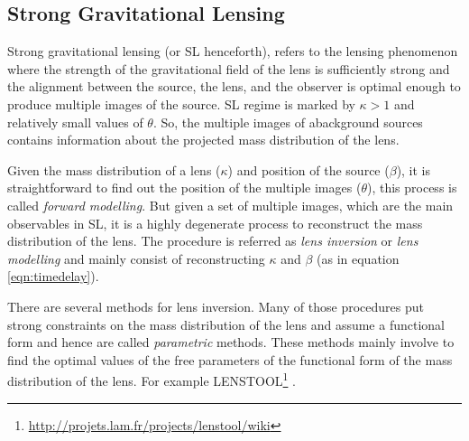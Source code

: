 \documentclass[
  11pt,
  twoside,
  openright,
  titlepage,
  headings=optiontoheadandtoc
]{scrbook}
\begin{document}

\subsection{Strong Gravitational Lensing}\label{sec:sl}

Strong gravitational lensing (or SL henceforth), refers to the lensing phenomenon
where the strength of the gravitational field of the lens is sufficiently strong and
the alignment between the source, the lens, and the observer is optimal enough to
produce multiple images of the source. SL regime is marked
by $\kappa >1$ and relatively small values of $\theta$. So, the multiple images of abackground sources contains information about the projected mass distribution of the lens. 

Given the mass distribution of a lens ($\kappa$) and position of the source ($\beta$),
it is straightforward to find out the position of the multiple images ($\theta$), this process
is called {\it forward modelling}. But given a set of multiple images, which are the main 
observables in SL, it is a highly degenerate process to reconstruct the mass
distribution of the lens. The procedure is referred as {\it lens inversion} or
{\it lens modelling} and mainly consist of reconstructing $\kappa$ and
$\beta$ (as in equation \ref{eqn:timedelay}). 

There are 
several methods for lens inversion. Many of those procedures put strong constraints
on the mass distribution of the lens and assume a functional form and hence are called
{\it parametric} methods. These methods mainly involve to find the optimal values 
of the free parameters of the functional form of the mass distribution of the lens. 
For example LENSTOOL\footnote{\url{http://projets.lam.fr/projects/lenstool/wiki}} 
\cite{2011ascl.soft02004K}.
\end{document}
